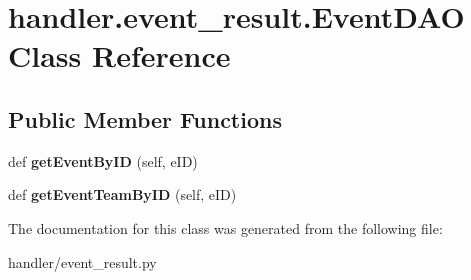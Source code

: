 \hypertarget{classhandler_1_1event__result_1_1_event_d_a_o}{}\section{handler.\+event\+\_\+result.\+Event\+D\+AO Class Reference}
\label{classhandler_1_1event__result_1_1_event_d_a_o}
\subsection*{Public Member Functions}
\begin{DoxyCompactItemize}
\item 
\mbox{\label{classhandler_1_1event__result_1_1_event_d_a_o_a698590f9752810235be987f026a79af7}} 
def {\bfseries get\+Event\+By\+ID} (self, e\+ID)
\item 
\mbox{\label{classhandler_1_1event__result_1_1_event_d_a_o_a17077e7dce3e546dd38b161781fb8bce}} 
def {\bfseries get\+Event\+Team\+By\+ID} (self, e\+ID)
\end{DoxyCompactItemize}


The documentation for this class was generated from the following file\+:\begin{DoxyCompactItemize}
\item 
handler/event\+\_\+result.\+py\end{DoxyCompactItemize}
